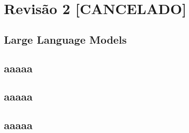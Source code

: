 
\chapter{Revisão 2 [CANCELADO]} 


    \section{Large Language Models}


    \section{aaaaa}


    \section{aaaaa}


    \section{aaaaa}

